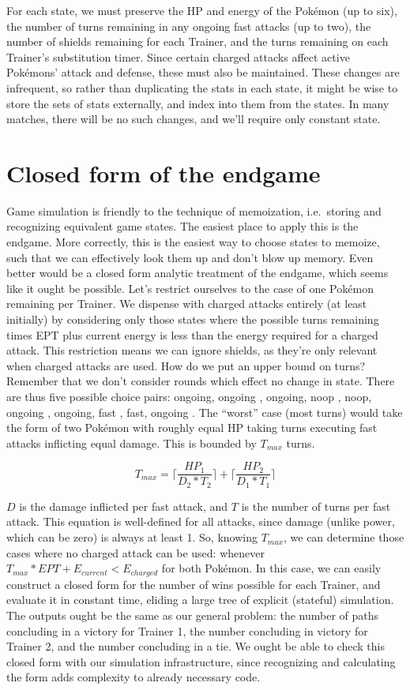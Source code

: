 For each state, we must preserve the HP and energy of the Pokémon (up to six),
  the number of turns remaining in any ongoing fast attacks (up to two),
  the number of shields remaining for each Trainer,
  and the turns remaining on each Trainer's substitution timer.
Since certain charged attacks affect active Pokémons' attack and defense,
  these must also be maintained.
These changes are infrequent, so rather than duplicating the stats in
  each state, it might be wise to store the sets of stats externally,
  and index into them from the states.
In many matches, there will be no such changes, and we'll require
  only constant state.

\section{Closed form of the endgame}
Game simulation is friendly to the technique of memoization, i.e.\ storing
  and recognizing equivalent game states.
The easiest place to apply this is the endgame.
More correctly, this is the easiest way to choose states to memoize,
  such that we can effectively look them up and don't blow up memory.
Even better would be a closed form analytic treatment of the endgame,
  which seems like it ought be possible.
Let's restrict ourselves to the case of one Pokémon remaining per Trainer.
We dispense with charged attacks entirely (at least initially) by considering
  only those states where the possible turns remaining times EPT plus current
  energy is less than the energy required for a charged attack.
This restriction means we can ignore shields, as they're only relevant
  when charged attacks are used.
How do we put an upper bound on turns?
Remember that we don't consider rounds which effect no change in state.
There are thus five possible choice pairs:
  { ongoing, ongoing },
  { ongoing, noop },
  { noop, ongoing },
  { ongoing, fast },
  { fast, ongoing }.
The ``worst'' case (most turns) would take the form of two Pokémon
  with roughly equal HP taking turns executing fast attacks
  inflicting equal damage.
This is bounded by $T_{max}$ turns.

\[ T_{max} = \lceil\frac{HP_1}{D_2 * T_2}\rceil + \lceil\frac{HP_2}{D_1 * T_1}\rceil \]

$D$ is the damage inflicted per fast attack, and $T$ is the number of turns per fast attack.
This equation is well-defined for all attacks, since damage (unlike power,
  which can be zero) is always at least 1.
So, knowing $T_{max}$, we can determine those cases where no charged attack
  can be used: whenever $T_{max} * EPT + E_{current} < E_{charged}$ for both Pokémon.
In this case, we can easily construct a closed form for the number of wins
  possible for each Trainer, and evaluate it in constant time, eliding
  a large tree of explicit (stateful) simulation.
The outputs ought be the same as our general problem: the number of paths
  concluding in a victory for Trainer 1, the number concluding in victory for
  Trainer 2, and the number concluding in a tie.
We ought be able to check this closed form with our simulation infrastructure,
  since recognizing and calculating the form adds complexity to
  already necessary code.

